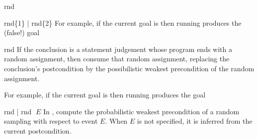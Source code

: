 \begin{tactic}{rnd}
\begin{tsyntax}{rnd\{1\} | rnd\{2\}}
    \bigskip For example, if the current goal is
     then
    running 
    produces the (false!) goal
  \end{tsyntax}

  \begin{tsyntax}{rnd}
    If the conclusion is a \phl statement judgement whose program ends
    with a random assignment, then consume that random assignment,
    replacing the conclusion's postcondition by the possibilistic
    weakest precondition of the random assignment.

    \bigskip For example, if the current goal is
     then
    running 
    produces the goal
  \end{tsyntax}

  \begin{tsyntax}{rnd | rnd $\;E$}
    In \phl, compute the probabilistic weakest precondition of a
    random sampling with respect to event $E$. When $E$ is not
    specified, it is inferred from the current postcondition.
  \end{tsyntax}
\end{tactic}
